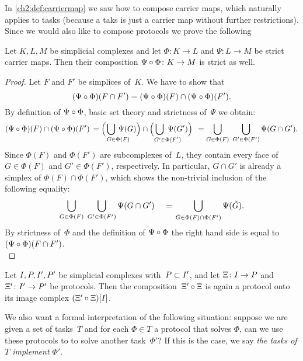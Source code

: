 In \cref{ch2:def:carriermap} we saw how to compose carrier maps,
which naturally applies to tasks (because a taks is just a carrier
map without further restrictions). Since we would also like to compose
protocols we prove the following

\begin{thLemma}
    Let $K,L,M$ be simplicial complexes and let $\Phi\colon K\to L$
    and $\Psi\colon L\to M$ be strict carrier maps.
    Then their composition $\Psi\after\Phi\colon K\to M$ is strict as well.
\end{thLemma}

\begin{proof}
    Let $F$ and $F'$ be simplices of~$K$. We have to show that
    \[ (\Psi\after\Phi)(F\cap F')
        = (\Psi\after\Phi)(F) \cap (\Psi\after\Phi)(F')
    . \]
    By definition of $\Psi\after\Phi$, basic set theory and strictness
    of~$\Psi$ we obtain:
    \[ (\Psi\after\Phi)(F) \cap (\Psi\after\Phi)(F')
        \,=
        \Bigl( \mkern2mu \bigcup_{G\in\mathrlap{\Phi(F)}} \, \Psi(G) \Bigr)
            \cap \Bigl( \bigcup_{G'\in\mathrlap{\Phi(F')}} \, \Psi(G') \Bigr)
        \mkern8mu=
        \bigcup_{G\in\Phi(F)} \; \bigcup_{G'\in\Phi(F')}
            \Psi(G\cap G')
    . \]
    Since $\Phi(F)$ and $\Phi(F')$ are subcomplexes of~$L$, they contain every
    face of $G\in\Phi(F)$ and $G'\in\Phi(F')$, respectively. In particular,
    $G\cap G'$ is already a simplex of $\Phi(F)\cap\Phi(F')$, which shows the
    non-trivial inclusion of the following equality:
    \[ \bigcup_{G\in\Phi(F)} \; \bigcup_{G'\in\Phi(F')} \Psi(G\cap G')
        \quad\mkern2mu=\mkern2mu
        \bigcup_{\tilde G\in\Phi(F)\cap \Phi(F')} \Psi(\tilde G)
    . \]
    By strictness of~$\Phi$ and the definition of $\Psi\after\Phi$ the right
    hand side is equal to $(\Psi\after\Phi)(F\cap F')$.
    \\
\end{proof}

\begin{thCorollary}
    Let $I,P,I',P'$ be simplicial complexes with~$P\subset I'$,
    and let $\Xi\colon I\to P$ and $\Xi'\colon I'\to P'$ be protocols.
    Then the composition~$\Xi'\after\Xi$ is again
    a protocol onto its image complex $(\Xi'\after\Xi)[\cI]$.
\end{thCorollary}

We also want a formal interpretation of the following situation: suppose we are
given a set of tasks~$T$ and for each $\Phi\in T$ a protocol that
solves $\Phi$, can we use these protocols to to solve another task~$\Phi'$? If
this is the case, we say \emph{the tasks of $T$ implement $\Phi'$}.

